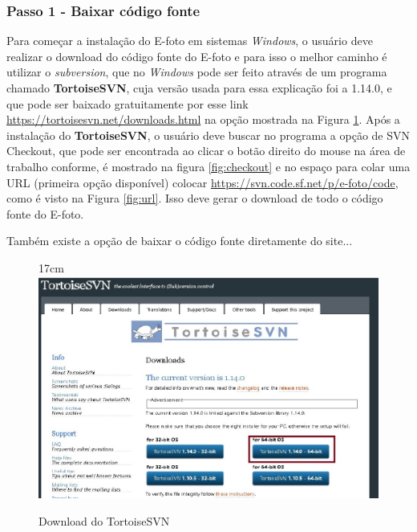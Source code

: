 \subsubsection{Passo 1 - Baixar código fonte}
Para começar a instalação do E-foto em sistemas \textit{Windows}, o usuário deve realizar o download do código fonte do E-foto e para isso o melhor caminho é utilizar o \textit{subversion}, que no \textit{Windows} pode ser feito através de um programa chamado \textbf{TortoiseSVN}, cuja versão usada para essa explicação foi a 1.14.0, e que pode ser baixado gratuitamente por esse link \url{https://tortoisesvn.net/downloads.html} na opção mostrada na Figura \ref{fig:tortoise}. Após a instalação do \textbf{TortoiseSVN}, o usuário deve buscar no programa a opção de SVN Checkout, que pode ser encontrada ao clicar o botão direito do mouse na área de trabalho conforme, é mostrado na figura \ref{fig:checkout} e no espaço para colar uma URL (primeira opção disponível) colocar \url{https://svn.code.sf.net/p/e-foto/code}, como é visto na Figura \ref{fig:url}. Isso deve gerar o download de todo o código fonte do E-foto.

Também existe a opção de baixar o código fonte diretamente do site...%
 
\begin{figure}[!ht]{17cm}
 	\centering
 	\includegraphics[width=12cm]{Figuras/tortoise.jpg}
 	\caption{Download do TortoiseSVN} \label{fig:tortoise}
\end{figure}

